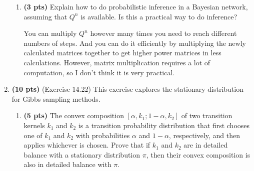 \documentclass{article}
\begin{document}
\begin{enumerate}
\begin{enumerate}[label=($\alph*$)]


    \item \textbf{(3 pts)} Explain how to do probabilistic inference in a Bayesian network, assuming that $Q^n$ is available. Is this a practical way to do inference?

    \color{blue}
        You can multiply $Q^n$ however many times you need to reach different numbers of steps. And you can do it efficiently by multiplying the newly calculated matrices together to get higher power matrices in less calculations. However, matrix multiplication requires a lot of computation, so I don't think it is very practical.
    \color{black}

    
    \end{enumerate}



\item \textbf{(10 pts)} (Exercise 14.22) This exercise explores the stationary distribution for Gibbs sampling methods.

\begin{enumerate}[label=($\alph*$)]


    \item \textbf{(5 pts)} The convex composition $[\alpha, k_1; 1-\alpha, k_2]$ of two transition kernels $k_1$ and $k_2$ is a transition probability distribution that first chooses one of $k_1$ and $k_2$ with probabilities $\alpha$ and $1-\alpha$, respectively, and then applies whichever is chosen. Prove that if $k_1$ and $k_2$ are in detailed balance with a stationary distribution $\pi$, then their convex composition is also in detailed balance with $\pi$.


\end{enumerate}
\end{enumerate}
\end{document}
